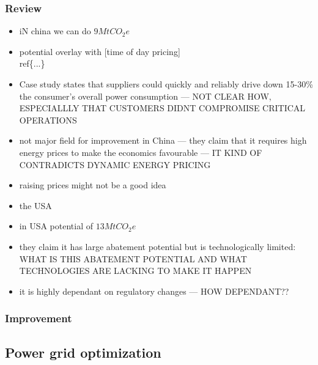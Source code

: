 \documentclass[11pt, twocolumn]{article}
\begin{document}
\subsubsection{Review}
\begin{itemize}
\item iN china we can do $9 Mt CO_2e$
\item potential overlay with  [time of day pricing]\\ref\{...\}
\item Case study states that suppliers could quickly and reliably drive down 15-30\% the consumer's overall power consumption --- NOT CLEAR HOW, ESPECIALLLY THAT CUSTOMERS DIDNT COMPROMISE CRITICAL OPERATIONS
\item not major field for improvement in China --- they claim that it requires high energy prices to make the economics favourable --- IT KIND OF CONTRADICTS DYNAMIC ENERGY PRICING
\item raising prices might not be a good idea

\item the USA
\item in USA potential of $13 MtCO_2e$
\item they claim it has large abatement potential but is technologically limited: WHAT IS THIS ABATEMENT POTENTIAL AND WHAT TECHNOLOGIES ARE LACKING TO MAKE IT HAPPEN
\item it is highly dependant on regulatory changes --- HOW DEPENDANT??

\end{itemize}
\subsubsection{Improvement}

\subsection{Power grid optimization}
\end{document}
